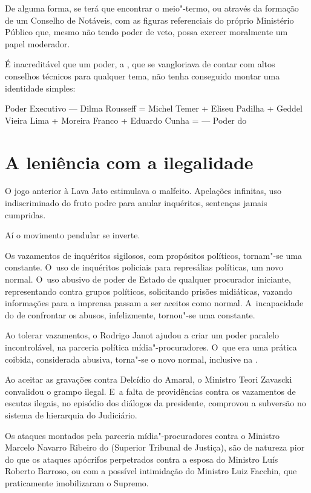 De alguma forma, se terá que encontrar o meio"-termo, ou através da
formação de um Conselho de Notáveis, com as figuras referenciais do
próprio Ministério Público que, mesmo não tendo poder de veto, possa
exercer moralmente um papel moderador.

É inacreditável que um poder, a , que se vangloriava de contar com
altos conselhos técnicos para qualquer tema, não tenha conseguido montar
uma identidade simples:

Poder Executivo --- Dilma Rousseff = Michel Temer + Eliseu Padilha +
Geddel Vieira Lima + Moreira Franco + Eduardo Cunha = --- Poder do 

\section{A leniência com a ilegalidade}

O jogo anterior à Lava Jato estimulava o malfeito. Apelações infinitas,
uso indiscriminado do fruto podre para anular inquéritos, sentenças
jamais cumpridas.

Aí o movimento pendular se inverte.

Os vazamentos de inquéritos sigilosos, com propósitos políticos,
tornam"-se uma constante. O~uso de inquéritos policiais para represálias
políticas, um novo normal. O~uso abusivo de poder de Estado de qualquer
procurador iniciante, representando contra grupos políticos, solicitando
prisões midiáticas, vazando informações para a imprensa passam a ser
aceitos como normal. A~incapacidade do  de confrontar os abusos,
infelizmente, tornou"-se uma constante.

Ao tolerar vazamentos, o  Rodrigo Janot ajudou a criar um poder
paralelo incontrolável, na parceria política mídia"-procuradores. O~que
era uma prática coibida, considerada abusiva, torna"-se o novo normal,
inclusive na .

Ao aceitar as gravações contra Delcídio do Amaral, o Ministro Teori
Zavascki convalidou o grampo ilegal. E~a falta de providências contra os
vazamentos de escutas ilegais, no episódio dos diálogos da presidente,
comprovou a subversão no sistema de hierarquia do Judiciário.

Os ataques montados pela parceria mídia"-procuradores contra o Ministro
Marcelo Navarro Ribeiro do  (Superior Tribunal de Justiça), são de
natureza pior do que os ataques apócrifos perpetrados contra a esposa do
Ministro Luís Roberto Barroso, ou com a possível intimidação do Ministro
Luiz Facchin, que praticamente imobilizaram o Supremo.


